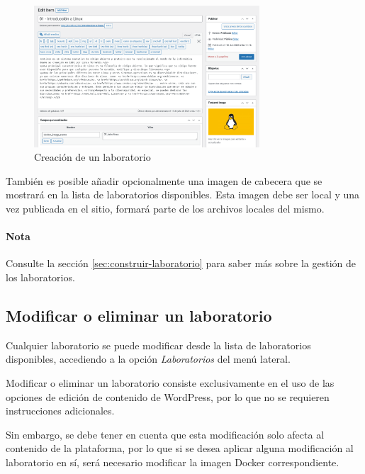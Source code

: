             \begin{figure}[!htbp]
                \centering

                \includegraphics[width=0.75\textwidth]{images/Capturas/localhost/creacion.png}
                \caption{Creación de un laboratorio}
                \label{fig:anadir-laboratorio}
            \end{figure}

            También es posible añadir opcionalmente una imagen de cabecera que se mostrará en la lista de laboratorios disponibles. Esta imagen debe ser local y una vez publicada en el sitio, formará parte de los archivos locales del mismo.

            \paragraph{Nota}
            
                Consulte la sección \ref{sec:construir-laboratorio} para saber más sobre la gestión de los laboratorios.

        \subsection{Modificar o eliminar un laboratorio}

            Cualquier laboratorio se puede modificar desde la lista de laboratorios disponibles, accediendo a la opción \textit{Laboratorios} del menú lateral.

            Modificar o eliminar un laboratorio consiste exclusivamente en el uso de las opciones de edición de contenido de WordPress, por lo que no se requieren instrucciones adicionales.

            Sin embargo, se debe tener en cuenta que esta modificación solo afecta al contenido de la plataforma, por lo que si se desea aplicar alguna modificación al laboratorio en sí, será necesario modificar la imagen Docker correspondiente.


